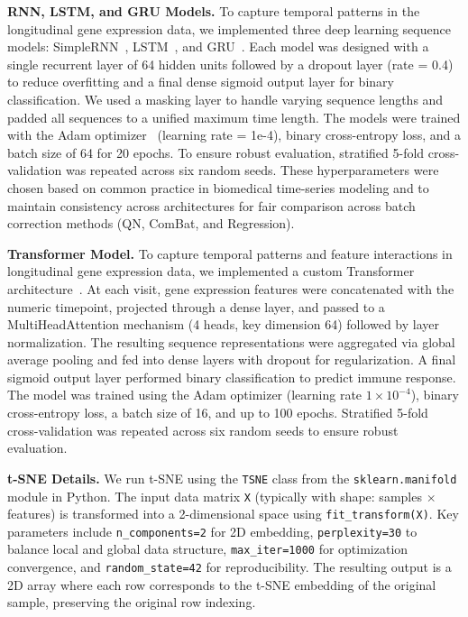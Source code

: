 \documentclass[
  12pt]{article}
\begin{document}
\textbf{RNN, LSTM, and GRU Models.} To capture temporal patterns in the longitudinal gene expression data, we implemented three deep learning sequence models: SimpleRNN~\citep{elman1990finding,rumelhart1986learning}, LSTM~\citep{hochreiter1997long}, and GRU~\citep{cho2014learning}. Each model was designed with a single recurrent layer of 64 hidden units followed by a dropout layer (rate = 0.4) to reduce overfitting and a final dense sigmoid output layer for binary classification. We used a masking layer to handle varying sequence lengths and padded all sequences to a unified maximum time length. The models were trained with the Adam optimizer~\citep{kingma2014adam} (learning rate = 1e-4), binary cross-entropy loss, and a batch size of 64 for 20 epochs. To ensure robust evaluation, stratified 5-fold cross-validation was repeated across six random seeds. These hyperparameters were chosen based on common practice in biomedical time-series modeling and to maintain consistency across architectures for fair comparison across batch correction methods (QN, ComBat, and Regression).

\textbf{Transformer Model.} 
To capture temporal patterns and feature interactions in longitudinal gene expression data, we implemented a custom Transformer architecture~\citep{vaswani2017attention}. 
At each visit, gene expression features were concatenated with the numeric timepoint, projected through a dense layer, and passed to a MultiHeadAttention mechanism (4 heads, key dimension 64) followed by layer normalization. 
The resulting sequence representations were aggregated via global average pooling and fed into dense layers with dropout for regularization. 
A final sigmoid output layer performed binary classification to predict immune response. 
The model was trained using the Adam optimizer (learning rate $1\times 10^{-4}$), binary cross-entropy loss, a batch size of 16, and up to 100 epochs. Stratified 5-fold cross-validation was repeated across six random seeds to ensure robust evaluation.

\textbf{t-SNE Details.} We run t-SNE using the \texttt{TSNE} class from the \texttt{sklearn.manifold} \citep{scikit-learn} module in Python. The input data matrix \texttt{X} (typically with shape: samples $\times$ features) is transformed into a 2-dimensional space using \texttt{fit\_transform(X)}. Key parameters include \texttt{n\_components=2} for 2D embedding, \texttt{perplexity=30} to balance local and global data structure, \texttt{max\_iter=1000} for optimization convergence, and \texttt{random\_state=42} for reproducibility. The resulting output is a 2D array where each row corresponds to the t-SNE embedding of the original sample, preserving the original row indexing.
\end{document}
